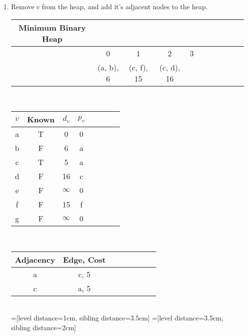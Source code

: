 \documentclass[11pt]{article}
\begin{document}
\begin{enumerate}
\begin{enumerate}
\item Remove c from the heap, and add it's adjacent nodes to the heap.\\
\begin{tabular}{ccccccccccc}
Minimum Binary Heap\\\hline
&0&1&2&3\\
& (a, b), 6& (c, f), 15& (c, d), 16\\
\end{tabular}\\
\begin{tabular}{c|ccccccc|}
$v$& Known& $d_v$ & $p_v$\\\hline
a& T & 0& 0\\
b&F & 6 & a\\
c&T & 5 & a\\
d&F & 16 & c\\
e&F & $\infty$ & 0\\
f&F & 15 & f\\
g&F & $\infty$ & 0
\end{tabular}\\
\begin{tabular}{c|ccccccc|}
Adjacency& Edge, Cost\\\hline
a& c, 5\\
c&a, 5&\\
\end{tabular}\\
=[level distance=1cm, sibling distance=3.5cm]
=[level distance=3.5cm, sibling distance=2cm]


\end{enumerate}
\end{enumerate}
\end{document}
